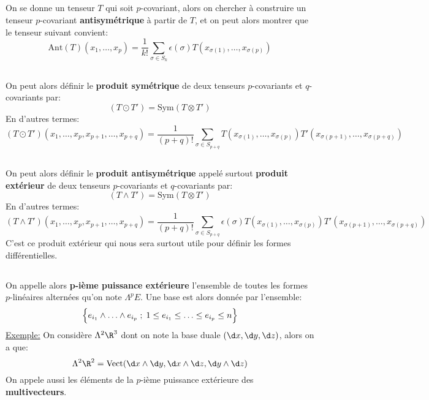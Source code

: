 \documentclass{report}
\begin{document}
   \subsection*{}
   On se donne un tenseur \(T\) qui soit \(p\)-covariant, alors on chercher à construire un tenseur \(p\)-covariant \textbf{antisymétrique} à partir de \(T\), et on peut alors montrer que le tenseur suivant convient:
   \[
      \text{Ant}(T)(x_1, \ldots, x_p) = \frac{1}{k!}\sum_{\sigma \in S_k}\epsilon(\sigma)T(x_{\sigma(1)}, \ldots, x_{\sigma(p)})
   \]
   \subsection*{}
   On peut alors définir le \textbf{produit symétrique} de deux tenseurs \(p\)-covariants et \(q\)-covariants par:
   \[
      (T \odot T') = \text{Sym}(T \otimes T')
   \]
   En d'autres termes:
   \[
      (T \odot T')(x_1, \ldots, x_p, x_{p+1}, \ldots, x_{p+q}) =  \frac{1}{(p+q)!}\sum_{\sigma \in S_{p+q}} T(x_{\sigma(1)}, \ldots, x_{\sigma(p)})T'(x_{\sigma(p+1)}, \ldots, x_{\sigma(p+q)})
   \]
   \subsection*{}
   On peut alors définir le \textbf{produit antisymétrique} appelé surtout \textbf{produit extérieur} de deux tenseurs \(p\)-covariants et \(q\)-covariants par:
   \[
      (T \wedge T') = \text{Sym}(T \otimes T')
   \]
   En d'autres termes:
   \[
      (T \wedge T')(x_1, \ldots, x_p, x_{p+1}, \ldots, x_{p+q}) =  \frac{1}{(p+q)!}\sum_{\sigma \in S_{p+q}}\epsilon(\sigma) T(x_{\sigma(1)}, \ldots, x_{\sigma(p)})T'(x_{\sigma(p+1)}, \ldots, x_{\sigma(p+q)})
   \]
   C'est ce produit extérieur qui nous sera surtout utile pour définir les formes différentielles.

   \subsection*{}
   On appelle alors \textbf{p-ième puissance extérieure} l'ensemble de toutes les formes \(p\)-linéaires alternées qu'on note \(\Lambda^p E\). Une base est alors donnée par l'ensemble:
   \[
      \Bigl\{ e_{i_1} \wedge \ldots \wedge e_{i_p} \; ; \; 1 \leq e_{i_1} \leq \ldots \leq e_{i_p} \leq n  \Bigl\}
   \]
   \uline{Exemple:} On considère \(\Lambda^2 \R^3\) dont on note la base duale \((\d x, \d y, \d z)\), alors on a que:
   \[
      \Lambda^2 \R^2 = \text{Vect}(\d x \wedge \d y, \d x \wedge \d z, \d y \wedge \d z)
   \]
   On appele aussi les éléments de la \(p\)-ième puissance extérieure des \textbf{multivecteurs}.
   
\end{document}
